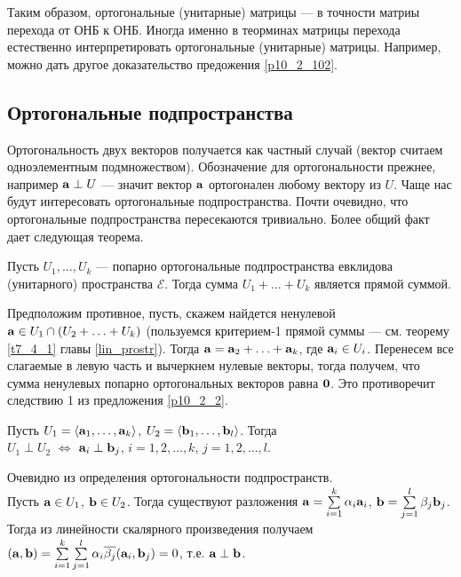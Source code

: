 \otstup

Таким образом, ортогональные (унитарные) матрицы --- в точности матриы перехода от ОНБ к ОНБ.
Иногда именно в теорминах матрицы перехода естественно интерпретировать ортогональные (унитарные) матрицы.
Например, можно дать другое доказательство предожения \ref{p10_2_102}.

\subsection{Ортогональные подпространства}


Ортогональность двух векторов получается как частный случай (вектор считаем одноэлементным подмножеством).
Обозначение для ортогональности прежнее, например $\mathbf{a}\perp U$ --- значит вектор $\mathbf{a}$ ортогонален любому вектору из $U$.
Чаще нас будут интересовать ортогональные подпространства.
Почти очевидно, что ортогональные подпространства пересекаются тривиально. Более общий факт дает следующая теорема.

\begin{theor}\label{t10_2_2} 
Пусть $U_1, \ldots, U_k$ --- попарно ортогональные подпространства евклидова (унитарного) пространства $\mathcal{E}$. 
Тогда сумма $U_1 + \ldots + U_k$ является прямой суммой.
\end{theor}
\dok
Предположим противное, пусть, скажем найдется ненулевой $\mathbf{a}\in U_1\cap (U_2+ \ldots +U_k)$ 
(пользуемся критерием-1 прямой суммы --- см. теорему \ref{t7_4_1} главы \ref{lin_prostr}).
Тогда $\mathbf{a}=\mathbf{a}_2+\ldots + \mathbf{a}_k$, где $\mathbf{a}_i\in U_i$. Перенесем все слагаемые в левую часть и вычеркнем нулевые векторы, тогда 
получем, что сумма ненулевых попарно ортогональных векторов равна $\mathbf{0}$. Это противоречит следствию 1 из предложения \ref{p10_2_2}. 
\edok


\begin{predl}\label{p10_2_3} 
Пусть $U_1= \langle \mathbf{a}_1, \ldots, \mathbf{a}_k \rangle$, $U_2= \langle \mathbf{b}_1, \ldots, \mathbf{b}_l \rangle$.
Тогда \\ $U_1 \perp U_2$
$\Leftrightarrow$ $\mathbf{a}_i\perp \mathbf{b}_j$, $i=1, 2, \ldots, k$, $j=1, 2, \ldots, l$.
\end{predl}
\dok
\dokright Очевидно из определения ортогональности подпространств.\\
\dokleft Пусть $\mathbf{a}\in U_1$, $\mathbf{b}\in U_2$. Тогда существуют разложения
 $\mathbf{a} = \sum\limits_{i=1}^k \alpha _i \mathbf{a}_i$,  
$\mathbf{b} = \sum\limits_{j=1}^l \beta _j \mathbf{b}_j$. Тогда 
из линейности скалярного произведения получаем $(\mathbf{a}, \mathbf{b}) = \sum\limits_{i=1}^k \sum\limits_{j=1}^l  \alpha _i \overline{\beta _j} (\mathbf{a}_i, \mathbf{b}_j)= 0$, 
т.е. $\mathbf{a} \perp \mathbf{b}$.
\edok



